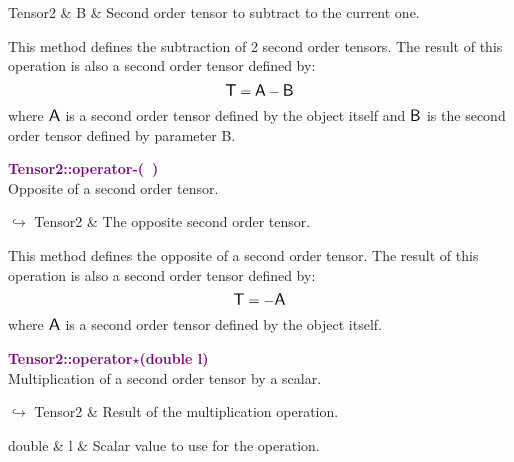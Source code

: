 \begin{tcolorbox}[width=\textwidth,myArgs,tabularx={ll|R}]
Tensor2 & B & Second order tensor to subtract to the current one.
\end{tcolorbox}

This method defines the subtraction of 2 second order tensors.
The result of this operation is also a second order tensor defined by:
\begin{equation*}
\mbox{\large\ensuremath{\mathsf{T}}} = \mbox{\large\ensuremath{\mathsf{A}}} - \mbox{\large\ensuremath{\mathsf{B}}}
\end{equation*}
where $\mbox{\large\ensuremath{\mathsf{A}}}$ is a second order tensor defined by the object itself and $\mbox{\large\ensuremath{\mathsf{B}}}$ is the second order tensor defined by parameter B.

\textcolor{purple}{\textbf{Tensor2::operator-(~)}}\label{Tensor2::operator-()}\\
Opposite of a second order tensor.\vspace*{-0.5em}
\begin{tcolorbox}[grow to left by=-1cm, width=\textwidth-1cm,myArgs,tabularx={l|R}]
$\hookrightarrow$ Tensor2 & The opposite second order tensor.
\end{tcolorbox}

This method defines the opposite of a second order tensor.
The result of this operation is also a second order tensor defined by:
\begin{equation*}
\mbox{\large\ensuremath{\mathsf{T}}} = - \mbox{\large\ensuremath{\mathsf{A}}}
\end{equation*}
where $\mbox{\large\ensuremath{\mathsf{A}}}$ is a second order tensor defined by the object itself.

\textcolor{purple}{\textbf{Tensor2::operator$\star$(double l)}}\label{Tensor2::operator*(double l)}\\
Multiplication of a second order tensor by a scalar.\vspace*{-0.5em}
\begin{tcolorbox}[grow to left by=-1cm, width=\textwidth-1cm,myArgs,tabularx={l|R}]
$\hookrightarrow$ Tensor2 & Result of the multiplication operation.
\end{tcolorbox}

\begin{tcolorbox}[width=\textwidth,myArgs,tabularx={ll|R}]
double & l & Scalar value to use for the operation.
\end{tcolorbox}

